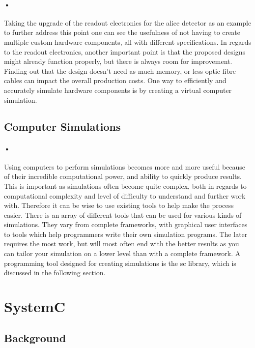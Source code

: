 \documentclass[a4paper, 12pt]{report}
\begin{document}
\paragraph{•}
Taking the upgrade of the readout electronics for the \gls{alice} detector as an example to further address this point one can see the usefulness of not having to create multiple custom hardware components, all with different specifications.
In regards to the readout electronics, another important point is that the proposed designs might already function properly, but there is always room for improvement.
Finding out that the design doesn't need as much memory, or less optic fibre cables can impact the overall production costs.
One way to efficiently and accurately simulate hardware components is by creating a virtual computer simulation.

\subsection{Computer Simulations}
\paragraph{•}
Using computers to perform simulations becomes more and more useful because of their incredible computational power, and ability to quickly produce results.
This is important as simulations often become quite complex, both in regards to computational complexity and level of difficulty to understand and further work with.
Therefore it can be wise to use existing tools to help make the process easier.
There is an array of different tools that can be used for various kinds of simulations.
They vary from complete frameworks, with graphical user interfaces to tools which help programmers write their own simulation programs.
The later requires the most work, but will most often end with the better results as you can tailor your simulation on a lower level than with a complete framework.
A programming tool designed for creating simulations is the \gls{sc} library, which is discussed in the following section.

\section{SystemC}

\subsection{Background}
\end{document}
